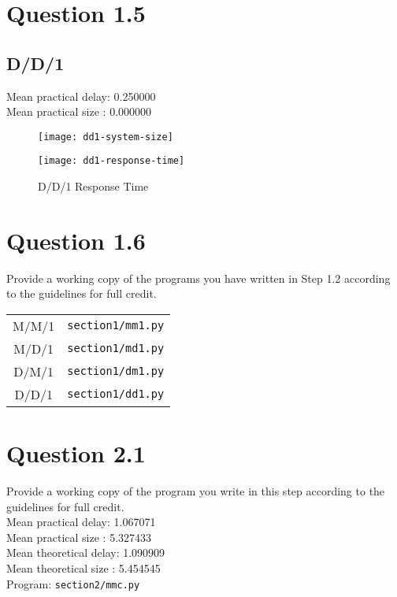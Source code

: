 \documentclass{article}
\newenvironment{homeworkProblem}[1]{
	\section*{#1}
	}{
}
\newenvironment{homeworkSection}[1]{
	\subsection*{#1}
	}{
}
\begin{document}
\begin{homeworkProblem}{Question 1.5}
\begin{homeworkSection}{D/D/1}
Mean practical delay: 0.250000\\
Mean practical size : 0.000000

\begin{figure}[H]
\begin{minipage}[t]{0.5\linewidth}
\centering
\texttt{[image: dd1-system-size]}
\caption{D/D/1 System Size}
\label{dd1-system-size}
\end{minipage}
\begin{minipage}[t]{0.5\linewidth}
\centering
\texttt{[image: dd1-response-time]}
\caption{D/D/1 Response Time}
\label{dd1-response-time}
\end{minipage}
\end{figure}

\end{homeworkSection}


\end{homeworkProblem}


\begin{homeworkProblem}{Question 1.6}
Provide a working copy of the programs you have written in Step 1.2 according to the guidelines for full credit.\\

\begin{tabular}{c c}
M/M/1 &\texttt{section1/mm1.py}\\
M/D/1 &\texttt{section1/md1.py}\\
D/M/1 &\texttt{section1/dm1.py}\\
D/D/1 &\texttt{section1/dd1.py}
\end{tabular}
\end{homeworkProblem}


\begin{homeworkProblem}{Question 2.1}
Provide a working copy of the program you write in this step according to the guidelines for full credit.\\

Mean practical delay: 1.067071\\
Mean practical size : 5.327433\\

Mean theoretical delay: 1.090909\\
Mean theoretical size : 5.454545\\

Program: \texttt{section2/mmc.py}
\end{homeworkProblem}
\end{document}
